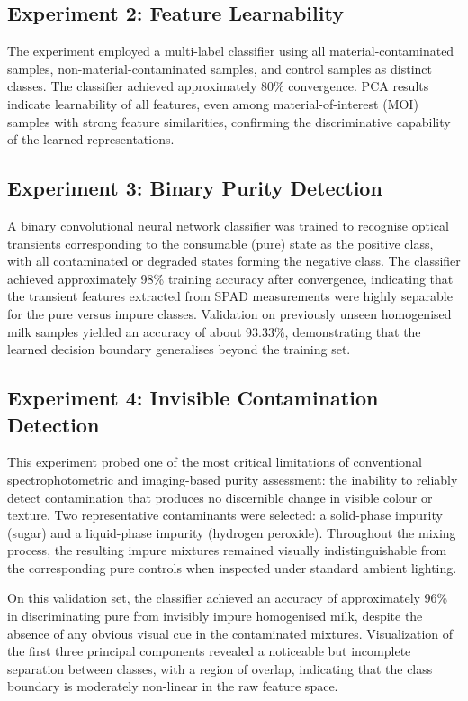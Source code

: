 \documentclass[11pt]{article}
\begin{document}
\subsection{Experiment 2: Feature Learnability}

The experiment employed a multi-label classifier using all material-contaminated samples, non-material-contaminated samples, and control samples as distinct classes. The classifier achieved approximately 80\% convergence. PCA results indicate learnability of all features, even among material-of-interest (MOI) samples with strong feature similarities, confirming the discriminative capability of the learned representations.

\subsection{Experiment 3: Binary Purity Detection}

A binary convolutional neural network classifier was trained to recognise optical transients corresponding to the consumable (pure) state as the positive class, with all contaminated or degraded states forming the negative class. The classifier achieved approximately 98\% training accuracy after convergence, indicating that the transient features extracted from SPAD measurements were highly separable for the pure versus impure classes. Validation on previously unseen homogenised milk samples yielded an accuracy of about 93.33\%, demonstrating that the learned decision boundary generalises beyond the training set.

\subsection{Experiment 4: Invisible Contamination Detection}

This experiment probed one of the most critical limitations of conventional spectrophotometric and imaging-based purity assessment: the inability to reliably detect contamination that produces no discernible change in visible colour or texture. Two representative contaminants were selected: a solid-phase impurity (sugar) and a liquid-phase impurity (hydrogen peroxide). Throughout the mixing process, the resulting impure mixtures remained visually indistinguishable from the corresponding pure controls when inspected under standard ambient lighting.

On this validation set, the classifier achieved an accuracy of approximately 96\% in discriminating pure from invisibly impure homogenised milk, despite the absence of any obvious visual cue in the contaminated mixtures. Visualization of the first three principal components revealed a noticeable but incomplete separation between classes, with a region of overlap, indicating that the class boundary is moderately non-linear in the raw feature space.
\end{document}
